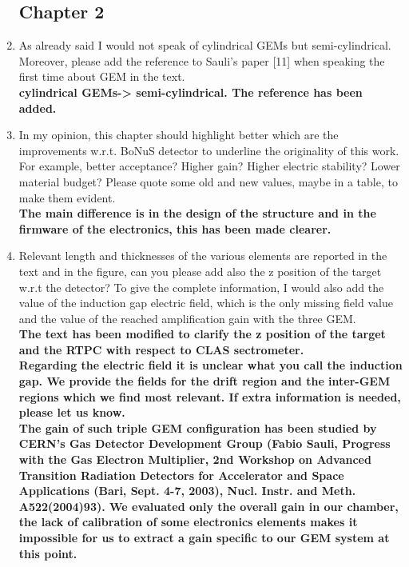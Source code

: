 \documentclass[a4paper,11pt,twoside]{article}
\begin{document}
\begin{enumerate}

\subsection*{Chapter 2}
\item As already said I would not speak of cylindrical GEMs but 
   semi-cylindrical. Moreover, please add the reference to Sauli's paper [11] 
   when speaking the first time about GEM in the text.\\
{ \bf cylindrical GEMs-> semi-cylindrical. The reference has been added.} 

\item In my opinion, this chapter should highlight better which are the 
   improvements w.r.t. BoNuS detector to underline the originality of this 
   work. For example, better acceptance? Higher gain? Higher electric 
   stability? Lower material budget? Please quote some old and new values, 
   maybe in a table, to make them evident.\\
{ \bf The main difference is in the design of the structure and in the
firmware of the electronics, this has been made clearer.} 

\item Relevant length and thicknesses of the various elements are reported in 
   the text and in the figure, can you please add also the z position of the 
   target w.r.t the detector? To give the complete information, I would also 
   add the value of the induction gap electric field, which is the only missing 
   field value and the value of the reached amplification gain with the three 
   GEM.\\
{ \bf  The text has been modified to clarify the z position of the 
target and the RTPC with respect to CLAS sectrometer.\\
Regarding the electric field it is unclear what you call the induction gap. We
provide the fields for the drift region and the inter-GEM regions which we 
find most relevant. If extra information is needed, please let us know.\\
The gain of such triple GEM configuration has been studied by 
CERN's Gas Detector Development Group (Fabio Sauli, Progress with the Gas 
Electron Multiplier, 2nd Workshop on Advanced Transition Radiation Detectors 
for Accelerator and Space Applications (Bari, Sept. 4-7, 2003), Nucl. Instr. 
and Meth. A522(2004)93). We evaluated only the overall gain in our chamber, 
the lack of calibration of some electronics elements makes it impossible for 
us to extract a gain specific to our GEM system at this point.}


\end{enumerate}
\end{document}
